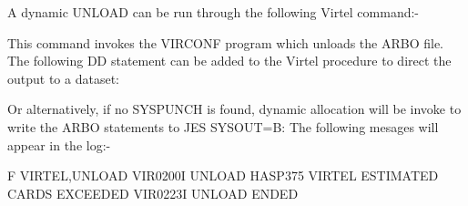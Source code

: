 \documentclass[letterpaper,10pt,english]{sphinxmanual}
\begin{document}
\ignorespaces 
A dynamic UNLOAD can be run through the following Virtel command:-

\begin{sphinxVerbatim}[commandchars=\\\{\}]
 
\end{sphinxVerbatim}

This command invokes the VIRCONF program which unloads the ARBO file. The following DD statement can be added to the Virtel procedure to direct the output to a dataset:

\begin{sphinxVerbatim}[commandchars=\\\{\}]
  
 
 
\end{sphinxVerbatim}

Or alternatively, if no SYSPUNCH is found, dynamic allocation will be invoke to write the ARBO statements to JES SYSOUT=B: The following mesages will appear in the log:-

\begin{sphinxVerbatim}[commandchars=\\\{\}]
F VIRTEL,UNLOAD
VIR0200I UNLOAD
\PYGZdl{}HASP375 VIRTEL ESTIMATED  CARDS EXCEEDED
VIR0223I UNLOAD ENDED
\end{sphinxVerbatim}

\ignorespaces 
\end{document}
